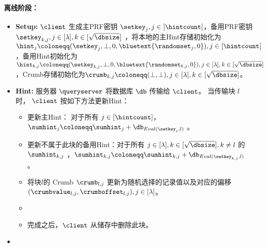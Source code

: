 \begin{mdframed}
        \paragraph{离线阶段：}
        \begin{itemize}
            \item \textbf{Setup:} $\client$ 生成主PRF密钥 $\setkey_j, j\in[\hintcount]$，备用PRF密钥 $\setkey_{k,j}, j\in[\lambda], k\in[\sqrt{\dbsize}]$ ，将本地的主Hint存储初始化为 $\hint_j\coloneqq(\setkey_j,\bot,0,\bluetext{\randomset_j,0}), j\in[\hintcount]$，备用Hint初始化为 $\hint_{k,j}\coloneqq(\setkey_{k,j},\bot, 0,\bluetext{\randomset_{k,j},0}), j\in[\lambda], k\in[\sqrt{\dbsize}]$，Crumb存储初始化为$\crumb_{k,j} \coloneqq (\bot,\bot),j\in[\lambda], k\in[\sqrt{\dbsize}]$。
            \item \textbf{Hint:} 服务器 $\queryserver$ 将数据库 $\db$ 传输给 $\client$。 当传输块 $l$ 时， $\client$ 按如下方法更新Hint：
                  \begin{itemize}
                      \item 更新主Hint： 对于所有 $j\in[\hintcount]$，$\sumhint_j \coloneqq \sumhint_j+\db_{Eval(\setkey_j, l)}$ 。
                      \item 更新不属于此块的备用Hint：对于所有 $j\in[\lambda], k\in[\sqrt{\dbsize}], k\neq l$ 的 $\sumhint_{k,j}$ ，$\sumhint_{k,j} \coloneqq  \sumhint_{k,j}+\db_{Eval(\setkey_{k,j}, l)} $ 。
                      \item 将块$l$的 Crumb $\crumb_{l,j}$ 更新为随机选择的记录值以及对应的偏移 $(\crumbvalue_{l,j}, \crumboffset_{l,j}), j\in[\lambda] $。
                      \item {}
                      \item 完成之后，$\client$ 从储存中删除此块。
                    \end{itemize}
                \item {}
        \end{itemize}

\end{mdframed}
